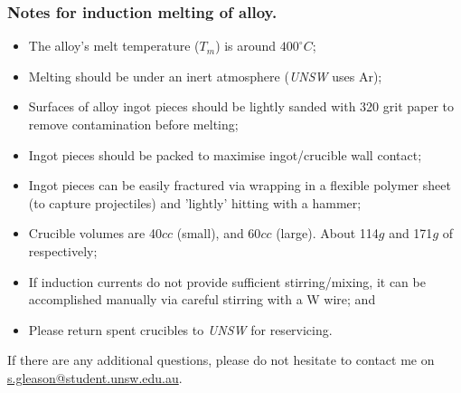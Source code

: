 \subsubsection{Notes for induction melting of \MgZnCa alloy.}
\begin{itemize}
\item The \MgZnCa alloy's melt temperature ($T_{m}$) is around $400^{\circ}C$;
\item Melting should be under an inert atmosphere (\textit{UNSW} uses Ar);
\item Surfaces of alloy ingot pieces should be lightly sanded with 320 grit paper to remove contamination before melting;
\item Ingot pieces should be packed to maximise ingot/crucible wall contact;
\item Ingot pieces can be easily fractured via wrapping in a flexible polymer sheet (to capture projectiles) and 'lightly' hitting with a hammer;
\item Crucible volumes are 40$cc$ (small), and 60$cc$ (large). About 114$g$ and 171$g$ of \MgZnCa respectively;
\item If induction currents do not provide sufficient stirring/mixing, it can be accomplished manually via careful stirring with a W wire; and
\item Please return spent crucibles to \textit{UNSW} for reservicing. 
\end{itemize}

If there are any additional questions, please do not hesitate to contact me on \href{"mailto:s.gleason@student.unsw.edu.au"}{s.gleason@student.unsw.edu.au}. 